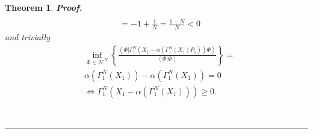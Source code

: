 \documentclass[aps,preprint]{revtex4}%
\newtheorem{theorem}{Theorem}
\newenvironment{proof}[1][Proof]{\noindent\textbf{#1.} }{\ \rule{0.5em}{0.5em}}
\begin{document}
\begin{theorem}
\begin{proof}
\begin{align}
\nonumber\\
&  =-1+\frac{1}{N}=\frac{1-N}{N}<0
\end{align}
and trivially
\begin{align}
&  \inf_{\Phi\in\mathcal{H}^{N}}\left\{  \frac{\left\langle \left.
\Phi\right\vert \Gamma_{1}^{N}\left(  X_{1}-\alpha\left(  \Gamma_{1}%
^{N}\left(  X_{1}\right)  P_{1}\right)  \right)  \Phi\right\rangle
}{\left\langle \left.  \Phi\right\vert \Phi\right\rangle }\right\}
=\nonumber\\
&  \alpha\left(  \Gamma_{1}^{N}\left(  X_{1}\right)  \right)  -\alpha\left(
\Gamma_{1}^{N}\left(  X_{1}\right)  \right)  =0\nonumber\\
&  \Leftrightarrow\Gamma_{1}^{N}\left(  X_{1}-\alpha\left(  \Gamma_{1}%
^{N}\left(  X_{1}\right)  \right)  \right)  \geq0.
\end{align}

\end{proof}
\end{theorem}
\end{document}
